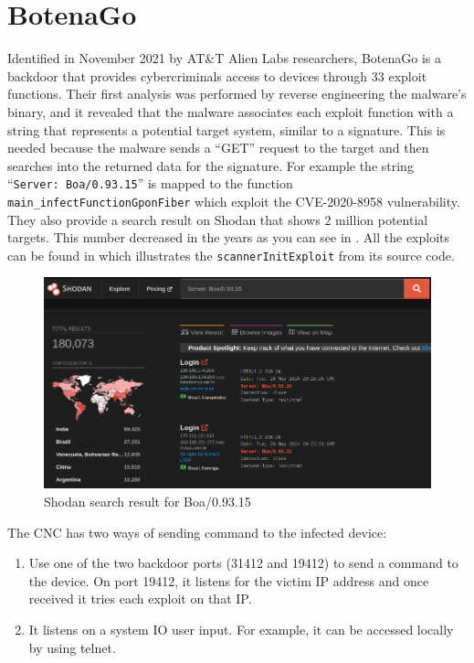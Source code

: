 \section{BotenaGo}

Identified in November 2021 by AT\&T Alien Labs researchers, BotenaGo is a backdoor that provides cybercriminals access to devices through 33 exploit functions. Their first analysis was performed by reverse engineering the malware's binary, and it revealed that the malware associates each exploit function with a string that represents a potential target system, similar to a signature. This is needed because the malware sends a ``GET'' request to the target and then searches into the returned data for the signature. For example the string ``\texttt{Server: Boa/0.93.15}'' is mapped to the function \texttt{main\_infectFunctionGponFiber} which exploit the CVE-2020-8958 vulnerability. They also provide a search result on Shodan that shows 2 million potential targets. This number decreased in the years as you can see in . All the exploits can be found in  which illustrates the \texttt{scannerInitExploit} from its source code.

\begin{figure}[ht]
    \centering
    \includegraphics[scale=0.4]{resources/images/boa-shodan.png}
    \caption{Shodan search result for Boa/0.93.15}
    \label{fig:boa-shodan}
\end{figure}

The CNC has two ways of sending command to the infected device:

\begin{enumerate}
    \item Use one of the two backdoor ports (31412 and 19412) to send a command to the device. On port 19412, it listens for the victim IP address and once received it tries each exploit on that IP.
    \item It listens on a system IO user input. For example, it can be accessed locally by using telnet. 
\end{enumerate}

